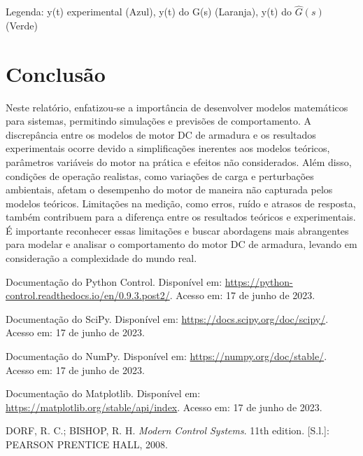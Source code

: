 \documentclass[10pt]{article}
\begin{document}
\quad Legenda: y(t) experimental (Azul), y(t) do G(s) (Laranja), y(t) do $\hat{G}(s)$ (Verde)

\section{Conclusão}

\quad Neste relatório, enfatizou-se a importância de desenvolver modelos matemáticos para sistemas,
permitindo simulações e previsões de comportamento.
A discrepância entre os modelos de motor DC de armadura e os resultados experimentais ocorre devido a simplificações inerentes aos modelos teóricos,
parâmetros variáveis do motor na prática e efeitos não considerados.
Além disso, condições de operação realistas, como variações de carga e perturbações ambientais,
afetam o desempenho do motor de maneira não capturada pelos modelos teóricos.
Limitações na medição, como erros, ruído e atrasos de resposta,
também contribuem para a diferença entre os resultados teóricos e experimentais.
É importante reconhecer essas limitações e buscar abordagens mais abrangentes para modelar e analisar o comportamento do motor DC de armadura,
levando em consideração a complexidade do mundo real.

\begin{thebibliography}{99}
     Documentação do Python Control. Disponível em: \url{https://python-control.readthedocs.io/en/0.9.3.post2/}. Acesso em: 17 de junho de 2023.
    
     Documentação do SciPy. Disponível em: \url{https://docs.scipy.org/doc/scipy/}. Acesso em: 17 de junho de 2023.

     Documentação do NumPy. Disponível em: \url{https://numpy.org/doc/stable/}. Acesso em: 17 de junho de 2023.
    
     Documentação do Matplotlib. Disponível em: \url{https://matplotlib.org/stable/api/index}. Acesso em: 17 de junho de 2023.

     DORF, R. C.; BISHOP, R. H. \textit{Modern Control Systems}. 11th edition. [S.l.]: PEARSON PRENTICE HALL, 2008.
\end{thebibliography}
\end{document}
